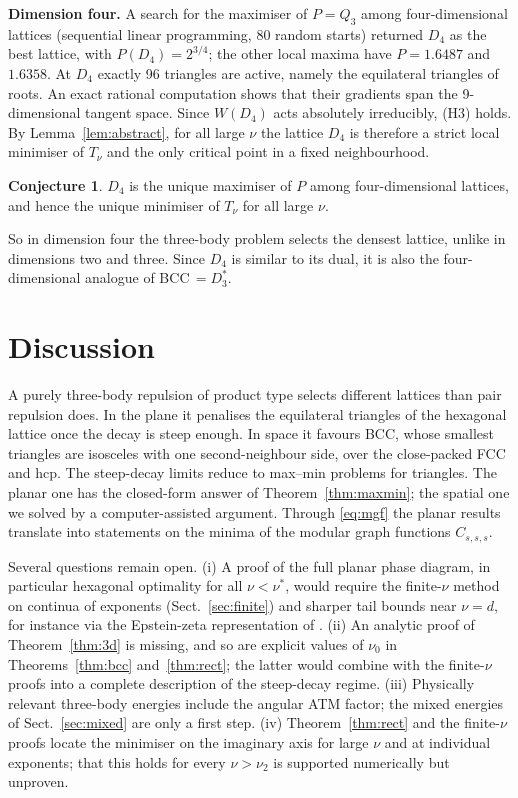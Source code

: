 \documentclass[10pt,twocolumn,a4paper]{article}
\theoremstyle{definition}
\newtheorem{conjecture}{Conjecture}
\begin{document}
\smallskip\noindent\textbf{Dimension four.} A search for the maximiser of $P=Q_3$ among four-dimensional lattices (sequential linear programming, 80 random starts) returned $D_4$ as the best lattice, with $P(D_4)=2^{3/4}$; the other local maxima have $P=1.6487$ and $1.6358$. At $D_4$ exactly 96 triangles are active, namely the equilateral triangles of roots. An exact rational computation shows that their gradients span the 9-dimensional tangent space. Since $W(D_4)$ acts absolutely irreducibly, (H3) holds. By Lemma~\ref{lem:abstract}, for all large $\nu$ the lattice $D_4$ is therefore a strict local minimiser of $T_\nu$ and the only critical point in a fixed neighbourhood.
\begin{conjecture}
$D_4$ is the unique maximiser of $P$ among four-dimensional lattices, and hence the unique minimiser of $T_\nu$ for all large $\nu$.
\end{conjecture}
So in dimension four the three-body problem selects the densest lattice, unlike in dimensions two and three. Since $D_4$ is similar to its dual, it is also the four-dimensional analogue of BCC$\,=D_3^*$.

\section{Discussion}\label{sec:discussion}
A purely three-body repulsion of product type selects different lattices than pair repulsion does. In the plane it penalises the equilateral triangles of the hexagonal lattice once the decay is steep enough. In space it favours BCC, whose smallest triangles are isosceles with one second-neighbour side, over the close-packed FCC and hcp. The steep-decay limits reduce to max--min problems for triangles. The planar one has the closed-form answer of Theorem~\ref{thm:maxmin}; the spatial one we solved by a computer-assisted argument. Through \eqref{eq:mgf} the planar results translate into statements on the minima of the modular graph functions $C_{s,s,s}$.

Several questions remain open. (i) A proof of the full planar phase diagram, in particular hexagonal optimality for all $\nu<\nu^*$, would require the finite-$\nu$ method on continua of exponents (Sect.~\ref{sec:finite}) and sharper tail bounds near $\nu=d$, for instance via the Epstein-zeta representation of \cite{BuchheitBusse}. (ii) An analytic proof of Theorem~\ref{thm:3d} is missing, and so are explicit values of $\nu_0$ in Theorems~\ref{thm:bcc} and~\ref{thm:rect}; the latter would combine with the finite-$\nu$ proofs into a complete description of the steep-decay regime. (iii) Physically relevant three-body energies include the angular ATM factor; the mixed energies of Sect.~\ref{sec:mixed} are only a first step. (iv) Theorem~\ref{thm:rect} and the finite-$\nu$ proofs locate the minimiser on the imaginary axis for large $\nu$ and at individual exponents; that this holds for every $\nu>\nu_2$ is supported numerically but unproven.
\end{document}
